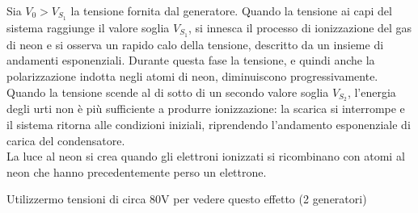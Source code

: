 \documentclass{article}
\begin{document}
Sia $V_0 > V_{S_1}$ la tensione fornita dal generatore. 
Quando la tensione ai capi del sistema raggiunge il valore soglia $V_{S_1}$, si innesca il processo di ionizzazione del gas di neon e si osserva un rapido calo della tensione, descritto da un insieme di andamenti esponenziali. 
Durante questa fase la tensione, e quindi anche la polarizzazione indotta negli atomi di neon, diminuiscono progressivamente. 
Quando la tensione scende al di sotto di un secondo valore soglia $V_{S_2}$, l'energia degli urti non è più sufficiente a produrre ionizzazione: la scarica si interrompe e il sistema ritorna alle condizioni iniziali,
riprendendo l’andamento esponenziale di carica del condensatore.\\
La luce al neon si crea quando gli elettroni ionizzati si ricombinano con atomi al neon che hanno precedentemente perso un elettrone. 


Utilizzermo tensioni di circa 80V per vedere questo effetto (2 generatori)
\end{document}
